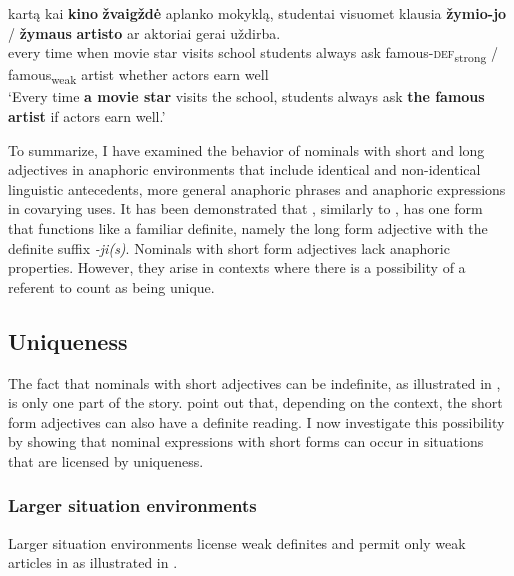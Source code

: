 \documentclass[output=paper,
modfonts
]{langscibook}
\begin{document}
\begin{exe}
	\ex \label{ex:sereikaite:44}
	 {kartą} {kai} \textbf{{kino}} \textbf{{žvaigždė}} {aplanko} {mokyklą}, {studentai} {visuomet} {klausia} \textbf{žymio-jo} \textnormal{/} \textbf{žymaus} \textbf{{artisto}} {ar} {aktoriai} {gerai} {uždirba}. \\
	every time when {movie} {star} visits school students always ask {famous-\textsc{def}\textsubscript{strong}} / {famous}\textsubscript{weak} {artist} whether actors earn well\\
	\trans `Every time \textbf{a movie star} visits the school, students always ask \textbf{the famous artist} if actors earn well.' 
\end{exe}

To summarize, I have examined the behavior of nominals with short and long adjectives in anaphoric environments that include identical and non-identical linguistic antecedents, more general anaphoric phrases and anaphoric expressions in covarying uses. It has been demonstrated that , similarly to , has one form that functions like a familiar definite, namely the long form adjective with the definite suffix \textit{-ji(s)}. Nominals with short form adjectives lack anaphoric properties. However, they arise in contexts where there is a possibility of a referent to count as being unique. 

\subsection{Uniqueness} \label{sec:sereikaite:4.3}

The fact that nominals with short adjectives can be indefinite, as illustrated in , is only one part of the story. \citet{GillonArmoskaite2015} point out that, depending on the context, the short form adjectives can also have a definite reading. I now investigate this possibility by showing that nominal expressions with short forms can occur in situations that are licensed by uniqueness.

\subsubsection{Larger situation environments}

Larger situation environments \citep{Hawkins1978} license weak definites and permit only weak articles in  as illustrated in .
\end{document}
